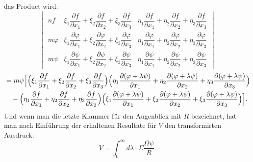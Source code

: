 \documentclass[10pt]{article}
\begin{document}
das Product wird:
\[
\begin{vmatrix}
nf&\xi_1\dfrac{\partial f}{\partial x_1}+\xi_2\dfrac{\partial f}{\partial x_2}+\xi_3\dfrac{\partial f}{\partial x_3}&\eta_1\dfrac{\partial f}{\partial x_1}+\eta_2\dfrac{\partial f}{\partial x_2}+\eta_3\dfrac{\partial f}{\partial x_3}\\
m\varphi&\xi_1\dfrac{\partial\varphi}{\partial x_1}+\xi_2\dfrac{\partial\varphi}{\partial x_2}+\xi_3\dfrac{\partial\varphi}{\partial x_3}&\eta_1\dfrac{\partial\varphi}{\partial x_1}+\eta_2\dfrac{\partial\varphi}{\partial x_2}+\eta_3\dfrac{\partial\varphi}{\partial x_3}\\
m\psi&\xi_1\dfrac{\partial\psi}{\partial x_1}+\xi_2\dfrac{\partial\psi}{\partial x_2}+\xi_3\dfrac{\partial\psi}{\partial x_3}&\eta_1\dfrac{\partial\psi}{\partial x_1}+\eta_2\dfrac{\partial\psi}{\partial x_2}+\eta_3\dfrac{\partial\psi}{\partial x_3}
\end{vmatrix}
\]
\[
\begin{aligned}
&=m\psi\Bigl[\Bigl(\xi_1\frac{\partial f}{\partial x_1}+\xi_2\frac{\partial f}{\partial x_2}+\xi_3\frac{\partial f}{\partial x_3}\Bigr)\Bigl(\eta_1\frac{\partial(\varphi+\lambda\psi)}{\partial x_1}+\eta_2\frac{\partial(\varphi+\lambda\psi)}{\partial x_2}+\eta_3\frac{\partial(\varphi+\lambda\psi)}{\partial x_3}\Bigr)\\
&\quad-\Bigl(\eta_1\frac{\partial f}{\partial x_1}+\eta_2\frac{\partial f}{\partial x_2}+\eta_3\frac{\partial f}{\partial x_3}\Bigr)\Bigl(\xi_1\frac{\partial(\varphi+\lambda\psi)}{\partial x_1}+\xi_2\frac{\partial(\varphi+\lambda\psi)}{\partial x_2}+\xi_3\frac{\partial(\varphi+\lambda\psi)}{\partial x_3}\Bigr)\Bigr].
\end{aligned}
\]
Und wenn man die letzte Klammer für den Augenblick mit $R$ bezeichnet, hat man nach Einführung der erhaltenen Resultate für $V$ den transformirten Ausdruck:
\[
V=\int_0^\infty d\lambda\cdot\Sigma\frac{\Omega\psi}{R}.
\]
\end{document}
